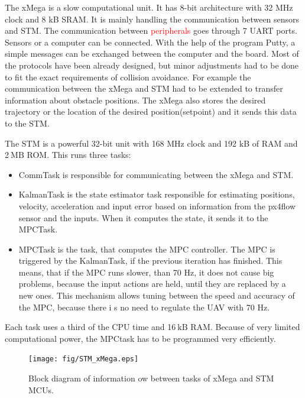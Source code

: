 \documentclass[a4paper,11pt,titlepage]{article}
\newcommand{\jed}[1]{\ensuremath{~\mathrm{#1}}}
\begin{document}
The xMega is a slow computational unit. It has 8-bit architecture with 32 MHz clock and 8 kB SRAM. It is mainly handling the communication between sensors and STM. The communication between \textcolor{red}{peripherals} goes through 7 UART ports. Sensors or a computer can be connected. With the help of the program Putty, a simple messages can be exchanged between the computer and the board. Most of the protocols have been already designed, but minor adjustments had to be done to fit the exact requirements of collision avoidance. For example the communication between the xMega and STM had to be extended to transfer information about obstacle positions. The xMega also stores the desired trajectory or the location of the desired position(setpoint) and it sends this data to the STM. 

The STM is a powerful 32-bit unit with 168 MHz clock and 192 kB of RAM and 2\jed{MB} ROM. This runs three tasks: 

\begin{itemize}
\item CommTask is responsible for communicating between the xMega and STM.

\item KalmanTask is the state estimator task responsible for estimating positions, velocity, acceleration and input error based on information from the px4flow sensor and the inputs. When it computes the state, it sends it to the MPCTask.

\item MPCTask is the task, that computes the MPC controller. The MPC is triggered by the KalmanTask, if the previous iteration has finished. This means, that if the MPC  runs slower, than 70 Hz, it does not cause big problems, because the input actions are held, until they are replaced by a new ones. This mechanism allows tuning between the speed and accuracy of the MPC, because there i	s no need to regulate the UAV with 70 Hz.
\end{itemize}

Each task uses a third of the CPU time and 16\jed{kB} RAM. Because of very limited computational power, the MPCtask has to be programmed very efficiently.

\begin{figure}[!ht]
\centering
\texttt{[image: fig/STM\_xMega.eps]}
\caption{Block diagram of information 
ow between tasks of xMega and STM MCUs.}
\label{fig:feasibility_algorithm}
\end{figure}
\end{document}
